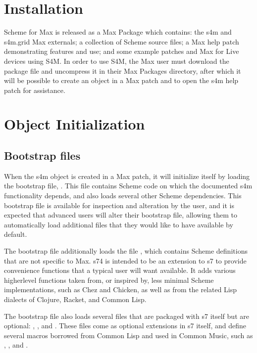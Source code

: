 \documentclass[letterpaper,10pt,english]{sphinxmanual}
\begin{document}
\section{Installation}
\label{\detokenize{features_usage:installation}}
\sphinxAtStartPar
Scheme for Max is released as a Max Package which contains: the s4m and s4m.grid Max externals;
a collection of Scheme source files; a Max help patch demonstrating features and use;
and some example patches and Max for Live devices using S4M.
In order to use S4M, the Max user must download the package file and uncompress it in their Max
Packages directory, after which it will be possible to create an  object in a Max patch
and to open the s4m help patch for assistance.


\section{Object Initialization}
\label{\detokenize{features_usage:object-initialization}}

\subsection{Bootstrap files}
\label{\detokenize{features_usage:bootstrap-files}}
\sphinxAtStartPar
When the s4m object is created in a Max patch, it will initialize itself by loading the bootstrap file, .
This file contains Scheme code on which the documented s4m functionality depends, and also loads several other Scheme dependencies.
This bootstrap file is available for inspection and alteration by the user, and it is expected that advanced users will
alter their bootstrap file, allowing them to automatically load additional files that they would like to have available by default.

\sphinxAtStartPar
The bootstrap file additionally loads the file , which contains Scheme definitions that are not specific to Max.
s74 is intended to be an extension to s7 to provide convenience functions that a typical user will want available.
It adds various higher\sphinxhyphen{}level functions taken from, or inspired by, less minimal Scheme implementations, such as Chez and Chicken,
as well as from the related Lisp dialects of Clojure, Racket, and Common Lisp.

\sphinxAtStartPar
The bootstrap file also loads several files that are packaged with s7 itself but are optional: , ,
and .
These files come as optional extensions in s7 itself, and define several macros borrowed from Common Lisp
and used in Common Music, such as , , and .
\end{document}
